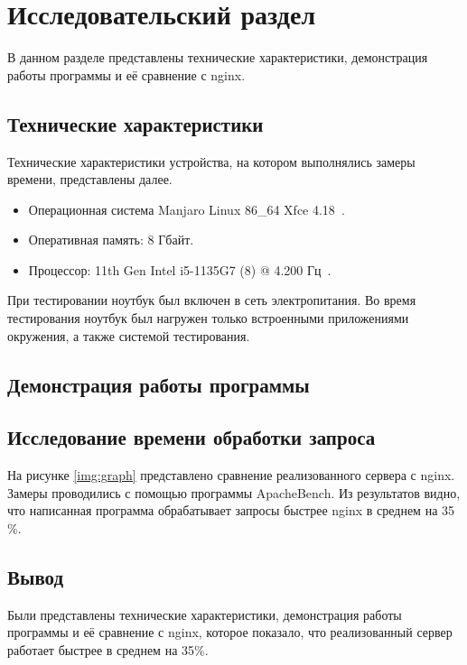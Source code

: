 \chapter{Исследовательский раздел}

В данном разделе представлены технические характеристики, демонстрация работы программы и её сравнение с nginx.

\section{Технические характеристики}

Технические характеристики устройства, на котором выполнялись замеры времени, представлены далее.

\begin{itemize}[label=---]
	\item Операционная система Manjaro Linux 86\_64 Xfce 4.18~\cite{linux}.
	\item Оперативная память: 8 Гбайт.
	\item Процессор: 11th Gen Intel i5-1135G7 (8) @ 4.200 Гц~\cite{cpu}.
\end{itemize}

При тестировании ноутбук был включен в сеть электропитания. Во время тестирования ноутбук был нагружен только встроенными приложениями окружения, а также системой тестирования.

\section{Демонстрация работы программы}
\section{Исследование времени обработки запроса}

На рисунке \ref{img:graph} представлено сравнение реализованного сервера с nginx. Замеры проводились с помощью программы ApacheBench. Из результатов видно, что написанная программа обрабатывает запросы быстрее nginx в среднем на 35$\%$.

\FloatBarrier

\section{Вывод}

Были представлены технические характеристики, демонстрация работы программы и её сравнение с nginx, которое показало, что реализованный сервер работает быстрее в среднем на 35$\%$.
